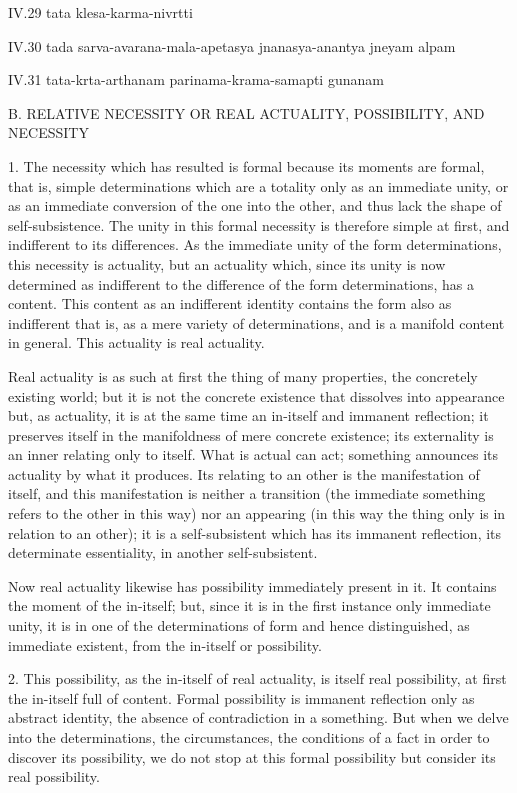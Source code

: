 IV.29
tata klesa-karma-nivrtti

IV.30
tada sarva-avarana-mala-apetasya jnanasya-anantya jneyam alpam

IV.31
tata-krta-arthanam parinama-krama-samapti gunanam

B. RELATIVE NECESSITY OR REAL ACTUALITY, POSSIBILITY, AND NECESSITY

1. The necessity which has resulted is formal
because its moments are formal,
that is, simple determinations which are a totality
only as an immediate unity,
or as an immediate conversion of the one into the other,
and thus lack the shape of self-subsistence.
The unity in this formal necessity is therefore simple at first,
and indifferent to its differences.
As the immediate unity of the form determinations,
this necessity is actuality,
but an actuality which, since its unity is now determined as indifferent
to the difference of the form determinations, has a content.
This content as an indifferent identity contains the form
also as indifferent that is, as a mere variety of determinations,
and is a manifold content in general.
This actuality is real actuality.

Real actuality is as such at first
the thing of many properties,
the concretely existing world;
but it is not the concrete existence
that dissolves into appearance
but, as actuality, it is at the same time
an in-itself and immanent reflection;
it preserves itself in the manifoldness of mere concrete existence;
its externality is an inner relating only to itself.
What is actual can act;
something announces its actuality by what it produces.
Its relating to an other is the manifestation of itself,
and this manifestation is
neither a transition
(the immediate something refers to the other in this way)
nor an appearing
(in this way the thing only is in relation to an other);
it is a self-subsistent which has its immanent reflection,
its determinate essentiality, in another self-subsistent.

Now real actuality likewise has possibility immediately present in it.
It contains the moment of the in-itself;
but, since it is in the first instance only immediate unity,
it is in one of the determinations of form
and hence distinguished, as immediate existent,
from the in-itself or possibility.

2. This possibility, as the in-itself of real actuality,
is itself real possibility, at first the in-itself full of content.
Formal possibility is immanent reflection only as abstract identity,
the absence of contradiction in a something.
But when we delve into the determinations,
the circumstances, the conditions of a fact
in order to discover its possibility,
we do not stop at this formal possibility
but consider its real possibility.

